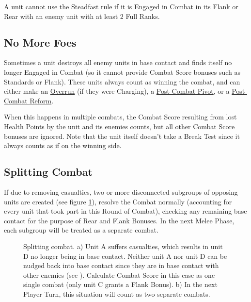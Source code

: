 A unit cannot use the Steadfast rule if it is Engaged in Combat in its Flank or Rear with an enemy unit with at least 2 Full Ranks.

\subsection{No More Foes}
\label{no_more_foes}

Sometimes a unit destroys all enemy units in base contact and finds itself no longer Engaged in Combat (so it cannot provide Combat Score bonuses such as Standards or Flank). These units always count as winning the combat, and can either make an \hyperref[overrun]{Overrun} (if they were Charging), a \hyperref[post_combat_pivot]{Post-Combat Pivot}, or a \hyperref[post_combat_reform]{Post-Combat Reform}.

When this happens in multiple combats, the Combat Score resulting from lost Health Points by the unit and its enemies counts, but all other Combat Score bonuses are ignored. Note that the unit itself doesn't take a Break Test since it always counts as if on the winning side.

\subsection{Splitting Combat}
\label{splitting_combat}

If due to removing casualties, two or more disconnected subgroups of opposing units are created (see figure \ref{figure/splitting_combat}), resolve the Combat normally (accounting for every unit that took part in this Round of Combat), checking any remaining base contact for the purpose of Rear and Flank Bonuses. In the next Melee Phase, each subgroup will be treated as a separate combat.

\newcommand{\figSplitA}{a)}
\newcommand{\figSplitB}{b)}

\begin{figure}[!htbp]
\renewcommand{\figbiglettersize}{17}
\centering
\def\svgwidth{0.75\textwidth}

\caption{Splitting combat.\captionpar
a) Unit A suffers casualties, which results in unit D no longer being in base contact. Neither unit A nor unit D can be nudged back into base contact since they are in base contact with other enemies (see ). Calculate Combat Score in this case as one single combat (only unit C grants a Flank Bonus).\captionpar
b) In the next Player Turn, this situation will count as two separate combats.}
\label{figure/splitting_combat}
\end{figure}

